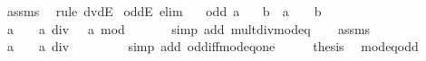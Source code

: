 \begin{isabellebody}
%
\isatagproof
{}\isamarkupfalse%
\ assms\ \isamarkupfalse%
\ {\isacharparenleft}{\kern0pt}rule\ dvdE{\isacharparenright}{\kern0pt}%
\endisatagproof
{\isafoldproof}%
%
\isadelimproof
\isanewline
%
\endisadelimproof
\isanewline
{}\isamarkupfalse%
\ oddE\ {\isacharbrackleft}{\kern0pt}elim{\isacharquery}{\kern0pt}{\isacharbrackright}{\kern0pt}{\isacharcolon}{\kern0pt}\isanewline
\ \ \ {\isachardoublequoteopen}odd\ a{\isachardoublequoteclose}\isanewline
\ \ \ b\ \ {\isachardoublequoteopen}a\ {\isacharequal}{\kern0pt}\ {}\ {\isacharasterisk}{\kern0pt}\ b\ {\isacharplus}{\kern0pt}\ {}{\isachardoublequoteclose}\isanewline
%
\isadelimproof
%
\endisadelimproof
%
\isatagproof
{}\isamarkupfalse%
\ {\isacharminus}{\kern0pt}\isanewline
\ \ \isamarkupfalse%
\ {\isachardoublequoteopen}a\ {\isacharequal}{\kern0pt}\ {}\ {\isacharasterisk}{\kern0pt}\ {\isacharparenleft}{\kern0pt}a\ div\ {}{\isacharparenright}{\kern0pt}\ {\isacharplus}{\kern0pt}\ a\ mod\ {}{\isachardoublequoteclose}\isanewline
\ \ \ \ \isamarkupfalse%
\ {\isacharparenleft}{\kern0pt}simp\ add{\isacharcolon}{\kern0pt}\ mult{\isacharunderscore}{\kern0pt}div{\isacharunderscore}{\kern0pt}mod{\isacharunderscore}{\kern0pt}eq{\isacharparenright}{\kern0pt}\isanewline
\ \ \isamarkupfalse%
\ assms\ \isamarkupfalse%
\ {\isachardoublequoteopen}a\ {\isacharequal}{\kern0pt}\ {}\ {\isacharasterisk}{\kern0pt}\ {\isacharparenleft}{\kern0pt}a\ div\ {}{\isacharparenright}{\kern0pt}\ {\isacharplus}{\kern0pt}\ {}{\isachardoublequoteclose}\isanewline
\ \ \ \ \isamarkupfalse%
\ {\isacharparenleft}{\kern0pt}simp\ add{\isacharcolon}{\kern0pt}\ odd{\isacharunderscore}{\kern0pt}iff{\isacharunderscore}{\kern0pt}mod{\isacharunderscore}{\kern0pt}{}{\isacharunderscore}{\kern0pt}eq{\isacharunderscore}{\kern0pt}one{\isacharparenright}{\kern0pt}\isanewline
\ \ \isamarkupfalse%
\ \isamarkupfalse%
\ {\isacharquery}{\kern0pt}thesis\ \isacommand{{\isachardot}{\kern0pt}{\isachardot}{\kern0pt}}\isamarkupfalse%
\isanewline
{}\isamarkupfalse%
%
\endisatagproof
{\isafoldproof}%
%
\isadelimproof
\isanewline
%
\endisadelimproof
\isanewline
{}\isamarkupfalse%
\ mod{\isacharunderscore}{\kern0pt}{}{\isacharunderscore}{\kern0pt}eq{\isacharunderscore}{\kern0pt}odd{\isacharcolon}{\kern0pt}\isanewline

\end{isabellebody}
